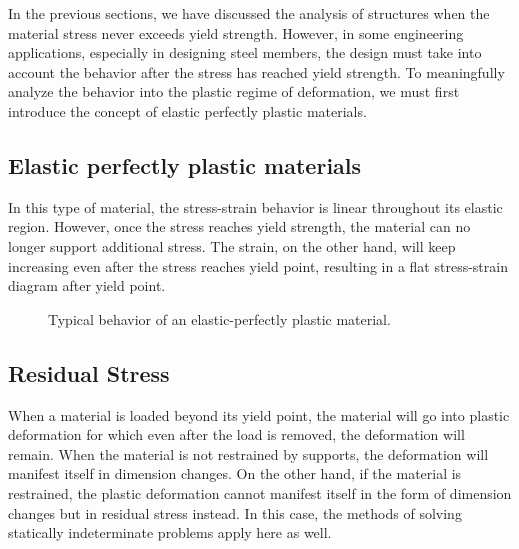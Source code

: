 \documentclass[
10pt,
a4paper,
openany,
svgnames,
]{book} %
\begin{document}
In the previous sections, we have discussed the analysis of structures when the material stress never exceeds yield strength. However, in some engineering applications, especially in designing steel members, the design must take into account the behavior after the stress has reached yield strength. To meaningfully analyze the behavior into the plastic regime of deformation, we must first introduce the concept of elastic perfectly plastic materials.

\subsection{Elastic perfectly plastic materials}

In this type of material, the stress-strain behavior is linear throughout its elastic region. However, once the stress reaches yield strength, the material can no longer support additional stress. The strain, on the other hand, will keep increasing even after the stress reaches yield point, resulting in a flat stress-strain diagram after yield point.

\begin{figure}[h]
  \centering
  \caption{Typical behavior of an elastic-perfectly plastic material.}
\end{figure}

\subsection{Residual Stress}

When a material is loaded beyond its yield point, the material will go into plastic deformation for which even after the load is removed, the deformation will remain. When the material is not restrained by supports, the deformation will manifest itself in dimension changes. On the other hand, if the material is restrained, the plastic deformation cannot manifest itself in the form of dimension changes but in residual stress instead. In this case, the methods of solving statically indeterminate problems apply here as well.
\end{document}
